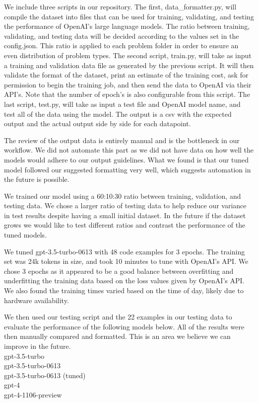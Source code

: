 \documentclass[acmsmall]{acmart}
\begin{document}
We include three scripts in our repository. The first, data\_formatter.py, will compile the dataset into files that can be used for training, validating, and testing the performance of OpenAI's large language models.
The ratio between training, validating, and testing data will be decided according to the values set in the config.json. This ratio is applied to each problem folder in order to ensure an even distribution of problem types. The second script, train.py, will take as input a training and validation data file as generated by the previous script.
It will then validate the format of the dataset, print an estimate of the training cost, ask for permission to begin the training job, and then send the data to OpenAI via their API's. Note that the number of epoch's is also configurable from this script. The last script, test.py, will take as input a test file and OpenAI model name, and test all of the data using the model. The output is a csv with the expected output and the actual output side by side for each datapoint.

The review of the output data is entirely manual and is the bottleneck in our workflow. We did not automate this part as we did not have data on how well the models would adhere to our output guidelines. What we found is that our tuned model followed our suggested formatting very well, which suggests automation in the future is possible.

We trained our model using a 60:10:30 ratio between training, validation, and testing data. We chose a larger ratio of testing data to help reduce our variance in test results despite having a small initial dataset. In the future if the dataset grows we would like to test different ratios and contrast the performance of the tuned models.

We tuned gpt-3.5-turbo-0613 with 48 code examples for 3 epochs. The training set was 24k tokens in size, and took 10 minutes to tune with OpenAI's API. We chose 3 epochs as it appeared to be a good balance between overfitting and underfitting the training data based on the loss values given by OpenAI's API. We also found the training times varied based on the time of day, likely due to hardware availability.

We then used our testing script and the 22 examples in our testing data to evaluate the performance of the following models below. All of the results were then manually compared and formatted. This is an area we believe we can improve in the future.
\newline
\\gpt-3.5-turbo
\\gpt-3.5-turbo-0613
\\gpt-3.5-turbo-0613 (tuned)
\\gpt-4
\\gpt-4-1106-preview\\
\end{document}
